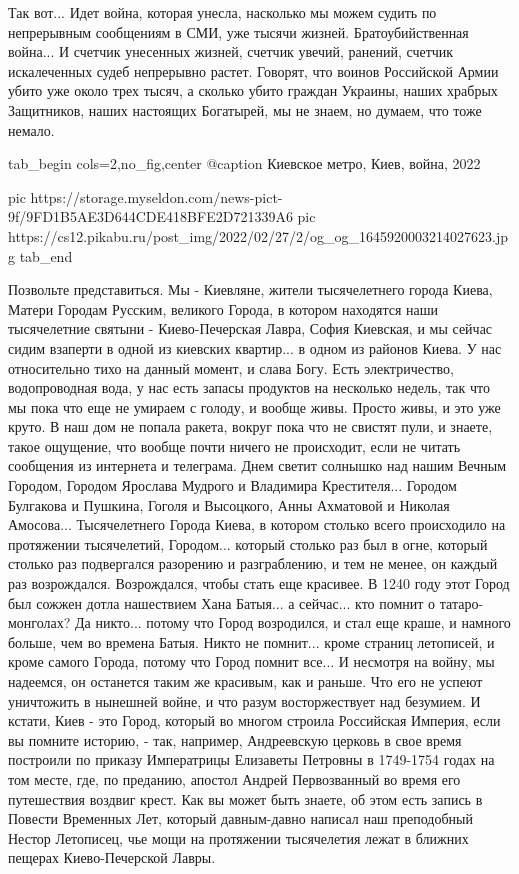 Так вот... Идет война, которая унесла, насколько мы можем судить по непрерывным
сообщениям в СМИ, уже тысячи жизней. Братоубийственная война... И счетчик
унесенных жизней, счетчик увечий, ранений, счетчик искалеченных судеб
непрерывно растет.  Говорят, что воинов Российской Армии убито уже около трех
тысяч, а сколько убито граждан Украины, наших храбрых Защитников, наших
настоящих Богатырей, мы не знаем, но думаем, что тоже немало. 

\ifcmt
  tab_begin cols=2,no_fig,center
		 @caption Киевское метро, Киев, война, 2022

		 pic https://storage.myseldon.com/news-pict-9f/9FD1B5AE3D644CDE418BFE2D721339A6
     pic https://cs12.pikabu.ru/post_img/2022/02/27/2/og_og_1645920003214027623.jpg
  tab_end
\fi

Позвольте представиться. Мы - Киевляне, жители тысячелетнего города Киева,
Матери Городам Русским, великого Города, в котором находятся наши тысячелетние
святыни - Киево-Печерская Лавра, София Киевская, и мы сейчас сидим взаперти в
одной из киевских квартир... в одном из районов Киева. У нас относительно тихо
на данный момент, и слава Богу. Есть электричество, водопроводная вода, у нас
есть запасы продуктов на несколько недель, так что мы пока что еще не умираем с
голоду, и вообще живы. Просто живы, и это уже круто. В наш дом не попала
ракета, вокруг пока что не свистят пули, и знаете, такое ощущение, что вообще
почти ничего не происходит, если не читать сообщения из интернета и телеграма.
Днем светит солнышко над нашим Вечным Городом, Городом Ярослава Мудрого и
Владимира Крестителя... Городом Булгакова и Пушкина, Гоголя и Высоцкого, Анны
Ахматовой и Николая Амосова...  Тысячелетнего Города Киева, в котором столько
всего происходило на протяжении тысячелетий, Городом... который столько раз был
в огне, который столько раз подвергался разорению и разграблению, и тем не
менее, он каждый раз возрождался. Возрождался, чтобы стать еще красивее. В 1240
году этот Город был сожжен дотла нашествием Хана Батыя... а сейчас... кто
помнит о татаро-монголах?  Да никто... потому что Город возродился, и стал еще
краше, и намного больше, чем во времена Батыя. Никто не помнит... кроме страниц
летописей, и кроме самого Города, потому что Город помнит все... И несмотря на
войну, мы надеемся, он останется таким же красивым, как и раньше.  Что его не
успеют уничтожить в нынешней войне, и что разум восторжествует над безумием.  И
кстати, Киев - это Город, который во многом строила Российская Империя, если вы
помните историю, - так, например, Андреевскую церковь в свое время построили по
приказу Императрицы Елизаветы Петровны в 1749-1754 годах на том месте, где, по
преданию, апостол Андрей Первозванный во время его путешествия воздвиг крест.
Как вы может быть знаете, об этом есть запись в Повести Временных Лет, который
давным-давно написал наш преподобный Нестор Летописец, чье мощи на протяжении
тысячелетия лежат в ближних пещерах Киево-Печерской Лавры.

